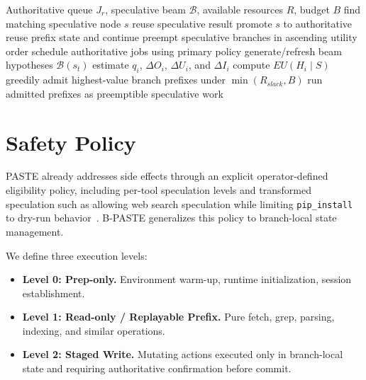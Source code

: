 \documentclass[10pt,twocolumn]{article}
\begin{document}
\begin{algorithm}[t]
\caption{Beam-Aware Opportunistic Speculative Scheduling}
\label{alg:bpaste}
\begin{algorithmic}[1]
\Require Authoritative queue $J_r$, speculative beam $\mathcal{B}$, available resources $R$, budget $B$
    \State find matching speculative node $s$
        \State reuse speculative result
        \State promote $s$ to authoritative
        \State reuse prefix state and continue
    \EndIf
\EndFor
{}
    \State preempt speculative branches in ascending utility order
\EndIf
\State schedule authoritative jobs using primary policy
\State generate/refresh beam hypotheses $\mathcal{B}(s_t)$
    \State estimate $q_i$, $\Delta O_i$, $\Delta U_i$, and $\Delta I_i$
    \State compute $EU(H_i \mid S)$
\EndFor
\State greedily admit highest-value branch prefixes under $\min(R_{slack}, B)$
\State run admitted prefixes as preemptible speculative work
\end{algorithmic}
\end{algorithm}

\section{Safety Policy}

PASTE already addresses side effects through an explicit operator-defined eligibility policy, including per-tool speculation levels and transformed speculation such as allowing web search speculation while limiting \texttt{pip\_install} to dry-run behavior~\cite{paste}. B-PASTE generalizes this policy to branch-local state management.

We define three execution levels:
\begin{itemize}[leftmargin=1.5em]
    \item \textbf{Level 0: Prep-only.} Environment warm-up, runtime initialization, session establishment.
    \item \textbf{Level 1: Read-only / Replayable Prefix.} Pure fetch, grep, parsing, indexing, and similar operations.
    \item \textbf{Level 2: Staged Write.} Mutating actions executed only in branch-local state and requiring authoritative confirmation before commit.
\end{itemize}
\end{document}
